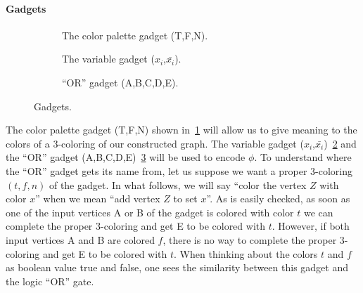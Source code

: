 \documentclass{article}
\begin{document}
\paragraph{Gadgets}
\begin{figure}
    \centering
    \begin{subfigure}[t]{0.333\textwidth}
        \centering
	\caption{The color palette gadget (T,F,N).}\label{fig:ga:pa}
    \end{subfigure}%
    \begin{subfigure}[t]{0.333\textwidth}
        \centering
	\caption{The variable gadget ($x_i$,$\bar{x_i}$).}\label{fig:ga:va}
    \end{subfigure}%
    \begin{subfigure}[t]{0.333\textwidth}
        \centering
	\caption{``OR'' gadget (A,B,C,D,E).}\label{fig:ga:or}
    \end{subfigure}
    \caption{Gadgets.}\label{fig:ga}
\end{figure}
The color palette gadget (T,F,N) shown in~\ref{fig:ga:pa} will allow us to give meaning
to the colors of a 3-coloring of our constructed graph.
The variable gadget ($x_i$,$\bar{x_i}$)~\ref{fig:ga:va} and the ``OR'' gadget
(A,B,C,D,E)~\ref{fig:ga:or} will be used to encode $\phi$. To understand where
the ``OR'' gadget gets its name from, let us suppose we want a proper 3-coloring
$(t,f,n)$ of the gadget. In what follows, we will say ``color the
vertex $Z$ with color $x$'' when we mean ``add vertex $Z$ to set $x$''. As is
easily checked, as soon as one of the input vertices A or B of the gadget is
colored with color $t$ we can complete the proper 3-coloring and get E to be
colored with $t$. However, if both input vertices A and B are colored $f$,
there is no way to complete the proper 3-coloring and get E to be colored
with $t$. When thinking about the colors $t$ and $f$ as boolean value true and
false, one sees the similarity between this gadget and the logic ``OR'' gate.
\end{document}
